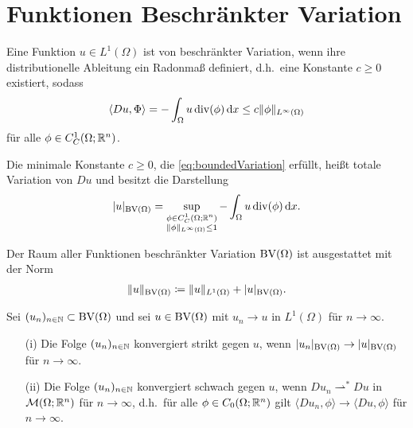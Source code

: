 \section{Funktionen Beschränkter Variation}

\begin{definition}
  Eine Funktion $u\in L^1(\Omega)$ ist von beschränkter Variation, wenn ihre
  distributionelle Ableitung ein Radonmaß definiert, d.h.\ eine Konstante
  $c\geq 0$ existiert, sodass 
  \begin{align}
    \label{eq:boundedVariation}
    \langle Du,\Phi\rangle = - \int_\Omega u\operatorname{div} (\phi) \,\mathrm{d}x 
    \leq c\Vert\phi\Vert_{L^\infty(\Omega)}
  \end{align}
  für alle $\phi\in C^1_C(\Omega;\mathbb{R}^n)$.

  Die minimale Konstante $c\geq 0$, die \eqref{eq:boundedVariation} erfüllt,
  heißt totale Variation von $Du$ und besitzt die Darstellung
  \begin{align*}
    |u|_{\textup{BV}(\Omega)} = \sup_{\substack{\phi\in C^1_C(\Omega;\mathbb{R}^n)\\
    \Vert\phi\Vert_{L^\infty(\Omega)}\leq 1}}-\int_\Omega u\operatorname{div} (\phi)\,\mathrm{d}x.
  \end{align*}

  Der Raum aller Funktionen beschränkter Variation $\textup{BV}(\Omega)$
  ist ausgestattet mit der Norm 
  \begin{align*}
    \Vert u \Vert_{\textup{BV}(\Omega)} \coloneqq \Vert u\Vert_{L^1(\Omega)} +
    |u|_{\textup{BV}(\Omega)}.
  \end{align*}
\end{definition}

\begin{definition}
  Sei $(u_n)_{n\in\mathbb{N}}\subset \textup{BV}(\Omega)$ und sei $u\in \textup{BV}(\Omega)$ mit
  $u_n\rightarrow u$ in $L^1(\Omega)$ für $n\rightarrow\infty$.
  \begin{itemize}
    \item[(i)]
      Die Folge $(u_n)_{n\in\mathbb{N}}$ konvergiert strikt gegen $u$,
      wenn
      $|u_n|_{\textup{BV}(\Omega)}\rightarrow |u|_{\textup{BV}(\Omega)}$ für $n\rightarrow\infty$.
    \item[(ii)] Die Folge $(u_n)_{n\in\mathbb{N}}$ konvergiert
      schwach gegen $u$, wenn
      $Du_n\rightharpoonup^\ast Du$ in 
      $\mathcal{M}(\Omega;\mathbb{R}^n)$ für $n\rightarrow\infty$, d.h.\ für alle
      $\phi\in C_0(\Omega;\mathbb{R}^n)$ gilt 
      $\langle Du_n,\phi\rangle\rightarrow \langle Du,\phi\rangle$ für 
      $n\rightarrow\infty$.
  \end{itemize}
\end{definition}

